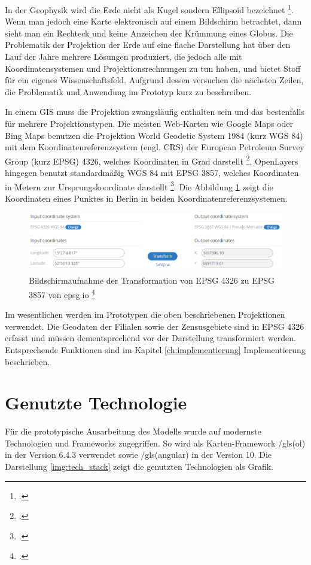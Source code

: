 In der Geophysik wird die Erde nicht als Kugel sondern Ellipsoid bezeichnet \footcite{jung_figur_1956}.
Wenn man jedoch eine Karte elektronisch auf einem Bildschirm betrachtet, dann sieht man ein Rechteck und keine Anzeichen der Krümmung eines Globus.
Die Problematik der Projektion der Erde auf eine flache Darstellung hat über den Lauf der Jahre mehrere Lösungen produziert, die jedoch alle mit Koordinatensystemen und Projektionsrechnungen zu tun haben, und bietet Stoff für ein eigenes Wissenschaftsfeld.
Aufgrund dessen versuchen die nächsten Zeilen, die Problematik und Anwendung im Prototyp kurz zu beschreiben.

In einem GIS muss die Projektion zwangsläufig enthalten sein und das bestenfalls für mehrere Projektionstypen.
Die meisten Web-Karten wie Google Maps oder Bing Maps benutzen die Projektion World Geodetic System 1984 (kurz WGS 84) mit dem Koordinatenreferenzsystem (engl. CRS) der European Petroleum Survey Group (kurz EPSG) 4326, welches Koordinaten in Grad darstellt \footcite{epsg.io_4326}.
OpenLayers hingegen benutzt standardmäßig WGS 84 mit EPSG 3857, welches Koordinaten in Metern zur Ursprungskoordinate darstellt \footcite{epsg.io_3857}.
Die Abbildung \ref{img:epsg.io} zeigt die Koordinaten eines Punktes in Berlin in beiden Koordinatenreferenzsystemen.

\begin{figure}[H]
	\centering
	\includegraphics[scale=0.6]{resources/images/projection_epsg.png}
	\caption{Bildschirmaufnahme der Transformation  von EPSG 4326 zu EPSG 3857 von epsg.io \footcite{epsg.io_transform}}
	\label{img:epsg.io}
\end{figure}

Im wesentlichen werden im Prototypen die oben beschriebenen Projektionen verwendet.
Die Geodaten der Filialen sowie der Zensusgebiete sind in EPSG 4326 erfasst und müssen dementsprechend vor der Darstellung transformiert werden.
Entsprechende Funktionen sind im Kapitel \ref{ch:implementierung} Implementierung beschrieben.

\section{Genutzte Technologie}
Für die prototypische Ausarbeitung des Modells wurde auf modernste Technologien und Frameworks zugegriffen. So wird als Karten-Framework /gls(ol) in der Version 6.4.3 verwendet sowie /gls(angular) in der Version 10.
Die Darstellung \ref{img:tech_stack} zeigt die genutzten Technologien als Grafik.

